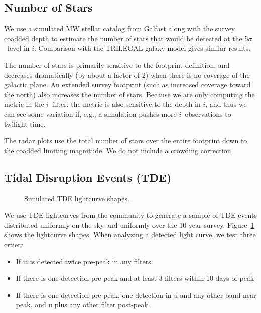 \subsection{Number of Stars}

We use a simulated MW stellar catalog from Galfast \citep{2018ascl.soft10001J, 2010AAS...21540125J} along with the survey coadded depth to estimate the number of stars that would be detected at the 5$\sigma$\ level in $i$. Comparison with the TRILEGAL galaxy model \citep{2012ASSP...26..165G} gives similar results.

The number of stars is primarily sensitive to the footprint definition, and decreases dramatically (by about a factor of 2) when there is no coverage of the galactic plane. An extended survey footprint (such as increased coverage toward the north) also increases the number of stars. Because we are only computing the metric in the $i$\ filter, the metric is also sensitive to the depth in $i$, and thus we can see some variation if, e.g., a simulation pushes more $i$\ observations to twilight time.

The radar plots use the total number of stars over the entire footprint down to the coadded limiting magnitude. We do not include a crowding correction.

\subsection{Tidal Disruption Events (TDE)}

\begin{figure}
\caption{Simulated TDE lightcurve shapes.}\label{fig:tdelc}
\end{figure}

We use TDE lightcurves from the community to generate a sample of TDE events distributed uniformly on the sky and uniformly over the 10 year survey.  Figure~\ref{fig:tdelc} shows the lightcurve shapes. When analyzing a detected light curve, we test three crtiera
\begin{itemize}
    \item{If it is detected twice pre-peak in any filters}
    \item{If there is one detection pre-peak and at least 3 filters within 10 days of peak}
    \item{If there is one detection pre-peak, one detection in u and any other band near peak, and u plus any other filter post-peak.}
\end{itemize}

